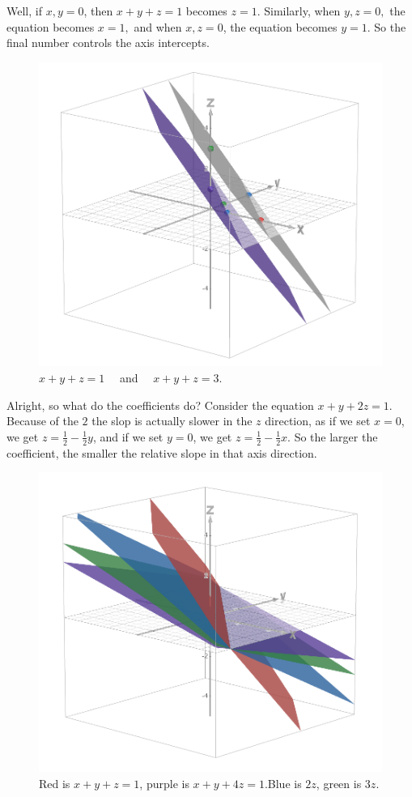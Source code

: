 \documentclass[12pt]{scrartcl}
\begin{document}
Well, if $x,y=0$, then $x+y+z=1$ becomes $z=1$. Similarly, when $y,z=0,$ the equation becomes $x=1,$ and when $x,z=0$, the equation becomes $y=1.$ So the final number controls the axis intercepts.
\begin{figure}[H]
    \centering
    \includegraphics[scale=0.5]{Intercepts of Linear Equations.png}
    \caption*{$x+y+z=1\quad$ and $\quad x+y+z=3.$}
\end{figure}
Alright, so what do the coefficients do? Consider the equation $x+y+2z = 1.$ Because of the $2$ the slop is actually slower in the $z$ direction, as if we set $x=0$, we get $z = \frac{1}{2} - \frac{1}{2}y$, and if we set $y=0$, we get $z = \frac{1}{2} - \frac{1}{2}x.$ So the larger the coefficient, the smaller the relative slope in that axis direction.

\begin{figure}[H]
    \centering
    \includegraphics[scale=0.35]{Coefficient Affects Slope in that Axis.png}
    \caption*{Red is $x+y+z=1$, \: purple is $x+y+4z=1$.\quad Blue is $2z$, \: green is $3z$.}
\end{figure}
\end{document}
